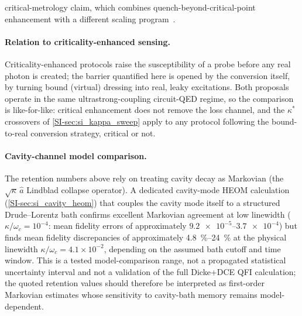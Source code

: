 \documentclass[aps,prxquantum,preprint,superscriptaddress,amsmath,amssymb]{revtex4-2}
\begin{document}
critical-metrology claim, which combines quench-beyond-critical-point enhancement with a different scaling program~\cite{Hotter2024}.

\paragraph{Relation to criticality-enhanced sensing.}
Criticality-enhanced protocols \cite{Hotter2024} raise the susceptibility of a probe before any real photon is created; the barrier quantified here is opened by the conversion itself, by turning bound (virtual) dressing into real, leaky excitations. Both proposals operate in the same ultrastrong-coupling circuit-QED regime, so the comparison is like-for-like: critical enhancement does not remove the loss channel, and the $\kappa^{\ast}$ crossovers of \cref{SI-sec:si_kappa_sweep} apply to any protocol following the bound-to-real conversion strategy, critical or not.

\paragraph{Cavity-channel model comparison.} The retention numbers above rely on treating cavity decay as Markovian (the $\sqrt{\kappa}\,\hat a$ Lindblad collapse operator). A dedicated cavity-mode HEOM calculation (\cref{SI-sec:si_cavity_heom}) that couples the cavity mode itself to a structured Drude--Lorentz bath confirms excellent Markovian agreement at low linewidth ($\kappa/\omega_c=10^{-4}$: mean fidelity errors of approximately $\num{9.2e-5}$--$\num{3.7e-4}$) but finds mean fidelity discrepancies of approximately \qty{4.8}{\percent}--\qty{24}{\percent} at the physical linewidth $\kappa/\omega_c=4.1\times10^{-2}$, depending on the assumed bath cutoff and time window. This is a tested model-comparison range, not a propagated statistical uncertainty interval and not a validation of the full Dicke+DCE QFI calculation; the quoted retention values should therefore be interpreted as first-order Markovian estimates whose sensitivity to cavity-bath memory remains model-dependent.
\end{document}
